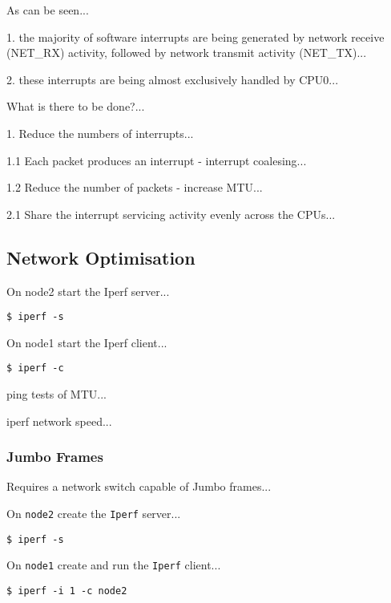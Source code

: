 As can be seen...

1. the majority of software interrupts are being generated by network receive (NET\_RX) activity, followed by network transmit activity (NET\_TX)...

2. these interrupts are being almost exclusively handled by CPU0...

What is there to be done?...

1. Reduce the numbers of interrupts...

1.1 Each packet produces an interrupt - interrupt coalesing...

1.2 Reduce the number of packets - increase MTU...

2.1 Share the interrupt servicing activity evenly across the CPUs...


%
%
\subsection{Network Optimisation}

On node2 start the Iperf server...

\lstset{style=type}
\begin{lstlisting}
$ iperf -s
\end{lstlisting}

On node1 start the Iperf client...

\lstset{style=type}
\begin{lstlisting}
$ iperf -c
\end{lstlisting}

ping tests of MTU...




iperf network speed...





\subsubsection{Jumbo Frames}

Requires a network switch capable of Jumbo frames...


On \verb|node2| create the \verb|Iperf| server...

\lstset{style=type}
\begin{lstlisting}
$ iperf -s
\end{lstlisting}

On \verb|node1| create and run the \verb|Iperf| client...

\lstset{style=type}
\begin{lstlisting}
$ iperf -i 1 -c node2
\end{lstlisting}

